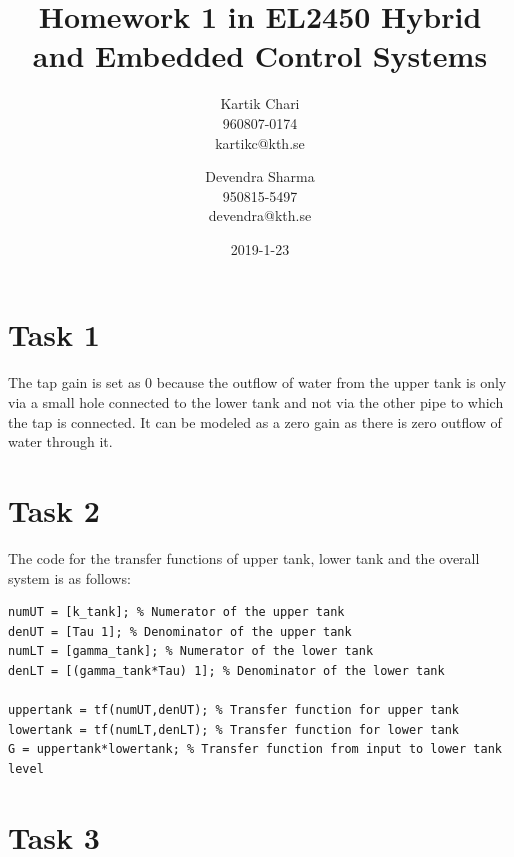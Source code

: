 \documentclass[a4paper,12pt,oneside,onecolumn]{article} %
\begin{document}

\title{Homework 1 in EL2450 Hybrid and Embedded Control Systems}
\author{
  Kartik Chari \\ 960807-0174 \\ kartikc@kth.se
  \and 
 Devendra Sharma \\ 950815-5497 \\ devendra@kth.se
  }
\date{2019-1-23}             %

\maketitle                     %





\section*{Task 1}

The tap gain is set as 0 because the outflow of water from the upper tank is only via a small hole connected to the lower tank and not via the other pipe to which the tap is connected. It can be modeled as a zero gain as there is zero outflow of water through it.

\section*{Task 2}

The code for the transfer functions of upper tank, lower tank and the overall system is as follows:
\begin{lstlisting}
numUT = [k_tank]; % Numerator of the upper tank
denUT = [Tau 1]; % Denominator of the upper tank
numLT = [gamma_tank]; % Numerator of the lower tank
denLT = [(gamma_tank*Tau) 1]; % Denominator of the lower tank

uppertank = tf(numUT,denUT); % Transfer function for upper tank
lowertank = tf(numLT,denLT); % Transfer function for lower tank
G = uppertank*lowertank; % Transfer function from input to lower tank level
\end{lstlisting}

\section*{Task 3}
\end{document}
